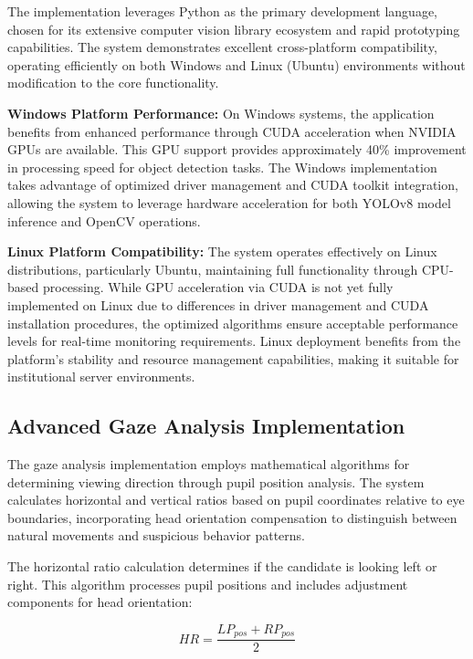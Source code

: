 \documentclass[conference]{IEEEtran}
\begin{document}
The implementation leverages Python as the primary development language, chosen for its 
extensive computer vision library ecosystem and rapid prototyping capabilities. The system 
demonstrates excellent cross-platform compatibility, operating efficiently on both Windows 
and Linux (Ubuntu) environments without modification to the core functionality.

\textbf{Windows Platform Performance:} On Windows systems, the application benefits from 
enhanced performance through CUDA acceleration when NVIDIA GPUs are available. This GPU 
support provides approximately 40\% improvement in processing speed for object detection 
tasks. The Windows implementation takes advantage of optimized driver management and CUDA 
toolkit integration, allowing the system to leverage hardware acceleration for both YOLOv8 
model inference and OpenCV operations.

\textbf{Linux Platform Compatibility:} The system operates effectively on Linux distributions, 
particularly Ubuntu, maintaining full functionality through CPU-based processing. While 
GPU acceleration via CUDA is not yet fully implemented on Linux due to differences in 
driver management and CUDA installation procedures, the optimized algorithms ensure 
acceptable performance levels for real-time monitoring requirements. Linux deployment 
benefits from the platform's stability and resource management capabilities, making it 
suitable for institutional server environments.

\subsection{Advanced Gaze Analysis Implementation}

The gaze analysis implementation employs mathematical algorithms for determining 
viewing direction through pupil position analysis. The system calculates horizontal and 
vertical ratios based on pupil coordinates relative to eye boundaries, incorporating head 
orientation compensation to distinguish between natural movements and suspicious behavior patterns.

The horizontal ratio calculation determines if the candidate is looking left or right. 
This algorithm processes pupil positions and includes adjustment components for head orientation:

\begin{equation}
HR = \frac{LP_{pos} + RP_{pos}}{2}
\end{equation}
\end{document}
